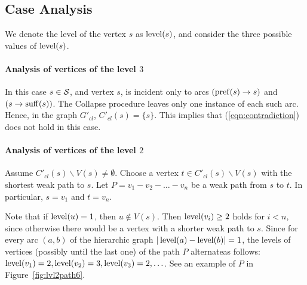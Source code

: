 \subsection{Case Analysis}
\label{sec:proof2}
We denote the level of the vertex $ s $ as $ \operatorname{level} (s) $, and consider the three possible values of $\operatorname{level}(s)$.


\paragraph{Analysis of vertices of the level \texorpdfstring{$3$}{3}}

In this case $ s \in {\cal S} $, and vertex $ s $, is incident only to arcs $ (\operatorname{pref} (s) \to s)$ and $(s \to \operatorname{suff} (s)) $. The Collapse procedure leaves only one instance of each such arc. Hence, in the graph $ G'_{cl} $, $ C'_{cl} (s) = \{s \} $. This implies that (\ref{eqn:contradiction}) does not hold in this case.

\paragraph{Analysis of vertices of the level \texorpdfstring{$2$}{2}}

Assume $ C'_{cl} (s) \backslash V (s) \ne\emptyset$. Choose a vertex $ t\in C'_{cl} (s) \backslash V (s)$ with the shortest weak path to $s$. Let $P = v_1 - v_2 - \ldots - v_n $ be a weak path from $s$ to $t$. In particular, $s=v_1$ and $t=v_n$.

Note that if $ \operatorname{level} (u) = 1 $, then $ u \notin V (s) $. Then $ \operatorname{level} (v_i) \ge 2 $ holds for $ i<n $, since otherwise there would be a vertex with a shorter weak path to $s$. Since for every arc $(a,b)$ of the hierarchic graph $ | \operatorname{level} (a) - \operatorname{level} (b) | = 1 $,  the levels of vertices (possibly until the last one) of the path $P$ alternateas follows: $ \operatorname{level} (v_1) = 2, \operatorname{level} (v_2) = 3, \operatorname{level} (v_3) = 2,\ldots$. See an example of $P$ in Figure~\ref{fig:lvl2path6}.

